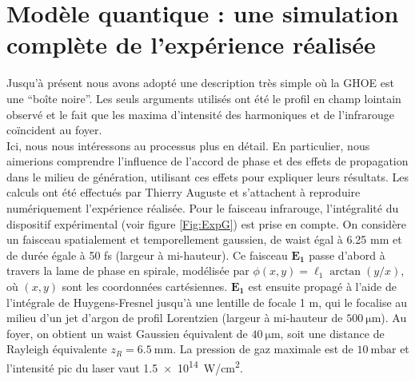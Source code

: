 \section{Modèle quantique : une simulation complète de l'expérience réalisée}
\label{sec:sfa}
Jusqu'à présent nous avons adopté une description très simple où la GHOE est une ``boîte noire''. Les seuls arguments utilisés ont été le profil en champ lointain observé et le fait que les maxima d'intensité des harmoniques et de l'infrarouge coïncident au foyer.\\
Ici, nous nous intéressons au processus plus en détail. En particulier, nous aimerions comprendre l'influence de l'accord de phase et des effets de propagation dans le milieu de génération,  utilisant ces effets pour expliquer leurs résultats. Les calculs ont été effectués par Thierry Auguste et s'attachent à reproduire numériquement l'expérience réalisée. Pour le faisceau infrarouge, l'intégralité du dispositif expérimental (voir figure \ref{Fig:ExpG}) est prise en compte. On considère un faisceau spatialement et temporellement gaussien, de waist égal à 6.25 mm et de durée égale à 50 fs (largeur à mi-hauteur). Ce faisceau $\bm{E_1}$ passe d'abord à travers la lame de phase en spirale, modélisée par $\phi(x,y) = \ell_1 \arctan{(y/x)}$, où $(x,y)$ sont les coordonnées cartésiennes. $\bm{E_1}$ est ensuite propagé à l'aide de l'intégrale de Huygens-Fresnel jusqu'à une lentille de focale 1 m, qui le focalise au milieu d'un jet d'argon de profil Lorentzien (largeur à mi-hauteur de $\SI{500}{\micro\meter}$). Au foyer, on obtient un waist Gaussien équivalent de $\SI{40}{\micro\meter}$, soit une distance de Rayleigh équivalente $z_R=\SI{6,5}\mm$. La pression de gaz maximale est de $\SI{10}{\milli\bar}$ et l'intensité pic du laser vaut \SI{1,5e14}{W/cm^2}.

